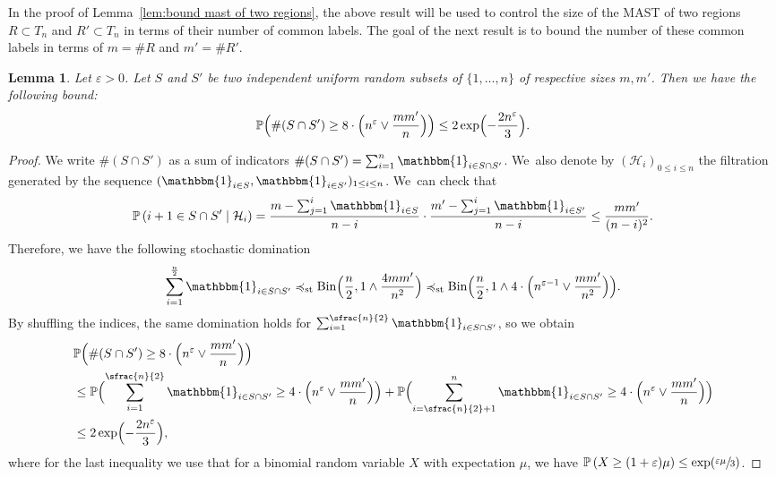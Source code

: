 \documentclass[JEP,XML,SOM,Unicode,NoFloatCountersInSection,published]{cedram}
\let\preceq\preccurlyeq
\newcommand{\Pp}[1]{\mathbb{P} \left(#1\right)}
\newcommand{\BPp}[1]{\mathbb{P} \Bigl(#1\Bigr)}
\newcommand{\Ppsq}[2]{\mathbb{P} \left(#1\mathrel{}\middle|\mathrel{}#2\right)}
\let\eps\varepsilon
\theoremstyle{plain}
\newtheorem{lemma}[theorem]{Lemma}
\theoremstyle{definition}
\begin{document}
In the proof of Lemma~\ref{lem:bound mast of two regions}, the above result will be used to control the size of the MAST of two regions $R\subset T_n$ and $R'\subset T_n$ in terms of their number of common labels.
The goal of the next result is to bound the number of these common labels in terms of $m=\# R$ and $m'=\# R'$.
\begin{lemma}\label{lem:size of the intersection of two indep subsets}
Let $\eps>0$.
Let $S$ and $S'$ be two independent uniform random subsets of $\{1,\dots,n\}$ of respective sizes $m,m'$. Then we have the following bound:
\begin{align*}
\BPp{\# (S\cap S') \geq 8 \cdot \Bigl(n^\eps\vee\frac{m m'}{n}\Bigr) } \leq 2\exp \Bigl(-\frac{2n^\eps}{3}\Bigr).
\end{align*}
\end{lemma}
\begin{proof}
We write $\# (S\cap S')$ as a sum of indicators $\# (S\cap S')=\sum_{i=1}^{n}\mathbbm{1}_{i\in S\cap S'}$. We~also denote by $(\mathcal H_i)_{0\leq i \leq n}$ the filtration generated by the sequence $(\mathbbm{1}_{i\in S},\mathbbm{1}_{i\in S'})_{1\leq i \leq n}$. We~can check that
\begin{align*}
\Ppsq{i+1\in S\cap S'}{\mathcal H_{i}}= \frac{m-\sum_{j=1}^{i}\mathbbm{1}_{i\in S}}{n-i} \cdot \frac{m'-\sum_{j=1}^{i}\mathbbm{1}_{i\in S'}}{n-i} \leq \frac{mm'}{(n-i)^2}.
\end{align*}
Therefore, we have the following stochastic domination
\begin{align*}
\sum_{i=1}^{\frac{n}{2}} \mathbbm{1}_{i\in S\cap S'} \preceq_{\mathrm{st}} \mathrm{Bin}\Bigl(\frac{n}{2},1 \wedge \frac{4mm'}{n^2}\Bigr)\preceq_{\mathrm{st}} \mathrm{Bin}\Bigl(\frac{n}{2},1\wedge 4\cdot \Bigl(n^{\eps -1} \vee \frac{mm'}{n^2}\Bigr) \Bigr).
\end{align*}
By shuffling the indices, the same domination holds for $\sum_{i=1}^{\sfrac{n}{2}} \mathbbm{1}_{i\in S\cap S'}$, so we obtain
\begin{align*}
&\BPp{\# (S\cap S') \geq 8 \cdot \Bigl(n^\eps\vee\frac{m m'}{n}\Bigr)}\\
&\leq \BPp{\sum_{i=1}^{\sfrac{n}{2}} \mathbbm{1}_{i\in S\cap S'}\geq 4 \cdot \Bigl(n^\eps\vee\frac{m m'}{n}\Bigr)}
+\BPp{\sum_{i=\sfrac{n}{2}+1}^n \mathbbm{1}_{i\in S\cap S'}\geq 4 \cdot \Bigl(n^\eps\vee\frac{m m'}{n}\Bigr)} \\
&\leq 2 \exp\Bigl(-\frac{2n^\eps}{3}\Bigr),
\end{align*}
where for the last inequality we use that for a binomial random variable $X$ with expectation $\mu$, we have $\Pp{X\geq (1+\eps)\mu}\leq \exp(\sfrac{\eps \mu }{3})$.
\end{proof}
\end{document}
